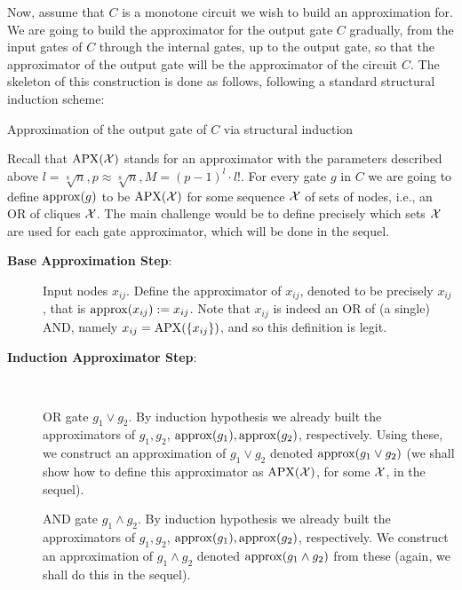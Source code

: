  

Now, assume that $C$ is a monotone circuit we wish to build an approximation for. We are going to build the approximator for the output gate $C$ gradually, from the input gates of $C$  through the internal gates, up to the output gate, so that the approximator of the output gate will be the approximator of the circuit $C$. The skeleton of this construction is done as follows, following a standard structural induction scheme:


\newcommand{\gapx}{\ensuremath{{\rm approx}}}

\begin{trailer}
{Approximation of the output gate of $C$ via structural induction}

Recall that $\mathrm{APX}({\mathcal X})$ stands for an approximator with the parameters described above $ l=\sqrt[8]{n} , p \approx \sqrt[8]{n}, M=(p-1)^l \cdot l!$.
For every gate $g$ in $C$ we are going to define $\gapx(g)$ to be $\mathrm{APX}(\mathcal{X})$ for some sequence $\mathcal{X}$ of sets of nodes, i.e., an OR of cliques $\mathcal{X}$. The main challenge would be to define precisely which sets $\mathcal{X}$ are used for each gate approximator, which will be done in the sequel.


\begin{description}
\item[\textbf{Base Approximation Step}:] 
Input nodes $x_{ij}$. Define the approximator of $x_{ij}$, denoted  to be precisely $x_{ij}$, that is $\gapx(x_{ij}):=x_{ij}$.
Note that $x_{ij}$ is indeed an OR of (a single) AND, namely $x_{ij}=\mathrm{APX}(\{x_{ij}\})$, and so this definition is legit.

\item[\textbf{Induction  Approximator Step}:]\

 OR gate $g_1\lor g_2$. By induction hypothesis we already built the approximators of $g_1,g_2$, $\gapx(g_1),\gapx(g_2)$, respectively. Using these, we construct an approximation of $g_1\lor g_2$ denoted $\gapx(g_1\lor g_2)$  (we shall show how to define this approximator as $\mathrm{APX}(\mathcal{X})$, for some $\mathcal{X}$, in the  sequel).

 AND gate $g_1\land g_2$. 
By induction hypothesis we already built the approximators 
of $g_1,g_2$, $\gapx(g_1),\gapx(g_2)$, respectively. 
We construct an approximation of $g_1\land g_2$ denoted 
$\gapx(g_1\land g_2)$ from these (again, we shall do this in the sequel).
\end{description} 
\end{trailer}


